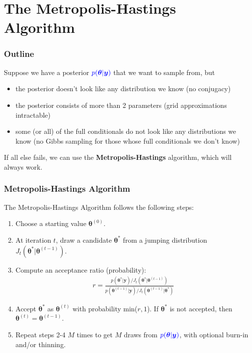 \documentclass[handout]{beamer}
\begin{document}
\section{The Metropolis-Hastings Algorithm}

\begin{frame}
\frametitle{Outline}
\tableofcontents[currentsection]
\end{frame}

\begin{frame}
Suppose we have a posterior $\textcolor{blue}{p(\bm{\theta} | \bm{y})}$ that we want to
sample from, but
\pause
\begin{itemize}
\item the posterior doesn't look like any distribution we know (no conjugacy)
\pause
\item the posterior consists of more than 2 parameters (grid
approximations intractable)
\pause
\item some (or all) of the full conditionals do not look like any
distributions we know (no Gibbs sampling for those whose full
conditionals we don't know)
\end{itemize}
\pause
\bigskip
If all else fails, we can use the \textbf{Metropolis-Hastings}
algorithm, which will always work.
\end{frame}

\begin{frame}
\frametitle{Metropolis-Hastings Algorithm}
\pause
The Metropolis-Hastings Algorithm follows the following steps:
\pause
\bigskip
\begin{enumerate}
\item Choose a starting value $\bm{\theta}^{(0)}$.
\pause
\item At iteration $t$, draw a candidate $\bm{\theta}^*$ from a jumping
distribution $J_t(\bm{\theta}^* | \bm{\theta}^{(t-1)})$.
\pause
\item Compute an acceptance ratio (probability):
\begin{eqnarray*}
r = \frac{p(\bm{\theta}^* | \bm{y})/J_t(\bm{\theta}^* | \bm{\theta}^{(t-1)})}{p(\bm{\theta}^{(t-1)} | \bm{y})/J_t(\bm{\theta}^{(t-1)} | \bm{\theta}^*)}
\end{eqnarray*}
\pause
\item Accept $\bm{\theta}^*$ as $\bm{\theta}^{(t)}$ with probability
min($r,1$).  If $\bm{\theta}^*$ is not accepted, then $\bm{\theta}^{(t)} = \bm{\theta}^{(t-1)}$.
\pause
\item Repeat steps 2-4 $M$ times to get $M$ draws from $\textcolor{blue}{p(\bm{\theta}
| \bm{y})}$, with optional burn-in and/or thinning.
\end{enumerate}
\end{frame}
\end{document}
